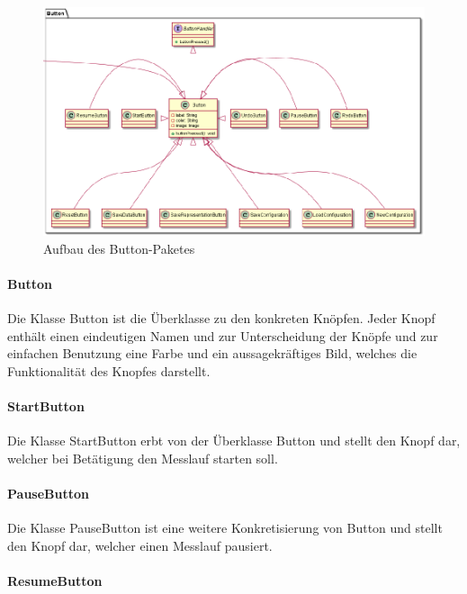 \documentclass[parskip=full]{scrartcl}
\begin{document}
\begin{figure}[htbp]
	\begin{center}
		\includegraphics[width = 14cm]{Grafiken/ButtonNamespace.png}
		\caption{Aufbau des Button-Paketes}
		\label{Entwurf_Grob}
	\end{center}
\end{figure}

\paragraph{Button}

Die Klasse Button ist die Überklasse zu den konkreten Knöpfen. Jeder Knopf enthält einen eindeutigen Namen und zur Unterscheidung der Knöpfe und zur einfachen Benutzung eine Farbe und ein aussagekräftiges Bild, welches die Funktionalität des Knopfes darstellt.

\paragraph{StartButton}

Die Klasse StartButton erbt von der Überklasse Button und stellt den Knopf dar, welcher bei Betätigung den Messlauf starten soll.

\paragraph{PauseButton}

Die Klasse PauseButton ist eine weitere Konkretisierung von Button und stellt den Knopf dar, welcher einen Messlauf pausiert.

\paragraph{ResumeButton}
\end{document}
